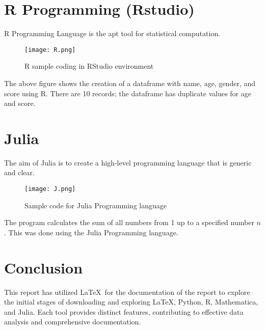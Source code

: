 \documentclass[12pt]{article}
\begin{document}
\newpage

\section{R Programming (Rstudio)}

R Programming Language is the apt tool for statistical computation.

\begin{figure}[H]
    \centering
    \texttt{[image: R.png]}
    \caption{R sample coding in RStudio environment} 
    \label{fig:r_programming}
\end{figure}

The above figure shows the creation of a dataframe with name, age, gender, and score using R. There are 10 records; the dataframe has duplicate values for age and score.

\section{Julia}

The aim of Julia is to create a high-level programming language that is generic and clear.

\begin{figure}[H]
    \centering
    \texttt{[image: J.png]}
    \caption{Sample code for Julia Programming language} 
    \label{fig:julia_programming}
\end{figure}
 
The program calculates the sum of all numbers from 1 up to a specified number \( n \). This was done using the Julia Programming language.

\section{Conclusion}

This report has utilized \LaTeX\ for the documentation of the report to explore the initial stages of downloading and exploring \LaTeX, Python, R, Mathematica, and Julia. Each tool provides distinct features, contributing to effective data analysis and comprehensive documentation.
\end{document}
